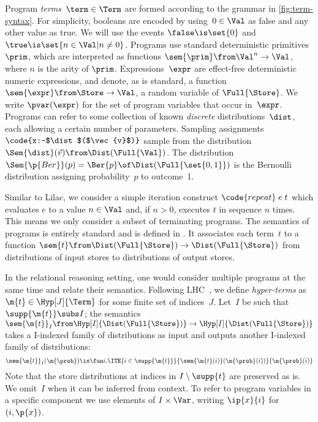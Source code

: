 \documentclass[acmsmall,nonacm,screen,appendix]{acmart}
\begin{document}
Program \emph{terms}~$ \term \in \Term $ are formed according to the
grammar in \cref{fig:term-syntax}.
For simplicity,
booleans are encoded by using~$0 \in \Val$ as false and any other value as true.
We will use the events
  $\false \is \set{0}$ and
  $\true \is \set{n \in \Val | n\ne 0}$.
Programs use standard deterministic primitives~$\prim$,
which are interpreted as functions
$ \sem{\prim} \from \Val^n \to \Val $, where $n$ is the arity of $\prim$.
Expressions~$\expr$ are effect-free deterministic numeric expressions,
and denote, as is standard, a function
$ \sem{\expr} \from \Store \to \Val $,
\ie a random variable of $\Full{\Store}$.
We write $\pvar(\expr)$ for the set of program variables that occur
in~$\expr$.
Programs can refer to some collection of known
\emph{discrete} distributions~$\dist$,
each allowing a certain number of parameters.
Sampling assignments $ \code{x:~$\dist$($\vec{v}$)} $
sample from the distribution $\Sem{\dist}(\vec{v}) \from \Dist(\Full{\Val})$.
The distribution $ \Sem{\p{Ber}}(p) = \Ber{p} \of\Dist(\Full{\set{0,1}}) $
is the Bernoulli distribution assigning probability~$p$ to outcome~1.

Similar to Lilac, we consider a simple iteration construct
$ \code{repeat}\; e\; t $ which evaluates $e$ to a value $n \in \Val$
and, if $n>0$, executes $t$ in sequence $n$ times.
This means we only consider a subset of terminating programs.
The semantics of programs is
entirely standard and is defined in .
It associates each term~$t$ to a function
$
  \sem{t} \from \Dist(\Full{\Store}) \to \Dist(\Full{\Store})
$
from distributions of input stores to
distributions of output stores.

In the relational reasoning setting, one would consider multiple
programs at the same time and relate their semantics.
Following LHC~\cite{d2022proving},
we define \emph{hyper-terms} as $ \m{t} \in \Hyp[J]{\Term} $
for some finite set of indices~$J$.
Let~$I$ be such that~$\supp{\m{t}} \subs I$; the semantics
$
  \sem{\m{t}}_I \from
      \Hyp[I]{\Dist(\Full{\Store})} \to \Hyp[I]{\Dist(\Full{\Store})}
$
takes a \pre I-indexed family of distributions as input and outputs
another \pre I-indexed family of distributions:
\[
  \sem{\m{t}}_I(\m{\prob}) \is
    \fun i.
    \ITE{i \in \supp{\m{t}}}{
      \sem{\m{t}(i)}(\m{\prob}(i))
    }{
      \m{\prob}(i)
    }
\]
Note that the store distributions at indices in $ I \setminus \supp{t} $
are preserved as is.
We omit~$I$ when it can be inferred from context.
To refer to program variables in a specific component we use
elements of $I\times \Var$, writing $\ip{x}{i}$ for $(i,\p{x})$.
\end{document}
